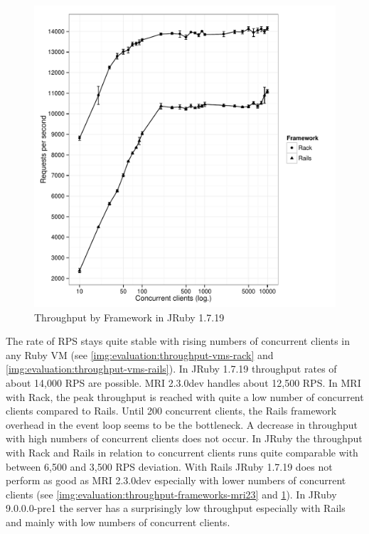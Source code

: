 		\begin{figure}
			\begin{center}
				\includegraphics[width=\textwidth]{images/throughput-frameworks-jruby17.pdf}
			\end{center}
			\caption{Throughput by Framework in JRuby 1.7.19}
			\label{img:evaluation:throughput-frameworks-jruby17}
		\end{figure}

		The rate of \acl{RPS} stays quite stable with rising numbers of
		concurrent clients in any Ruby \ac{VM} (see
		\autoref{img:evaluation:throughput-vms-rack} and
		\ref{img:evaluation:throughput-vms-rails}). In JRuby 1.7.19 throughput
		rates of about 14,000 \acl{RPS} are possible. \ac{MRI} 2.3.0dev handles
		about 12,500 \acl{RPS}. In \ac{MRI} with Rack, the peak throughput is
		reached with quite a low number of concurrent clients compared to
		\ac{Rails}. Until 200 concurrent clients, the \ac{Rails} framework
		overhead in the event loop seems to be the bottleneck. A decrease in
		throughput with high numbers of concurrent clients does not occur. In
		JRuby the throughput with Rack and \ac{Rails} in relation to concurrent
		clients runs quite comparable with between 6,500 and 3,500 \acl{RPS}
		deviation. With Rails JRuby 1.7.19 does not perform as good as \ac{MRI}
		2.3.0dev especially with lower numbers of concurrent clients (see
		\autoref{img:evaluation:throughput-frameworks-mri23} and
		\ref{img:evaluation:throughput-frameworks-jruby17}). In JRuby
		9.0.0.0-pre1 the server has a surprisingly low throughput especially
		with \ac{Rails} and mainly with low numbers of concurrent clients.

